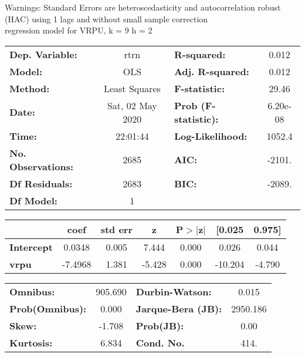 Warnings: \newline
 [1] Standard Errors are heteroscedasticity and autocorrelation robust (HAC) using 1 lags and without small sample correction\\ 

regression model for VRPU, k = 9 h = 2\begin{center}
\begin{tabular}{lclc}
\toprule
\textbf{Dep. Variable:}    &       rtrn       & \textbf{  R-squared:         } &     0.012   \\
\textbf{Model:}            &       OLS        & \textbf{  Adj. R-squared:    } &     0.012   \\
\textbf{Method:}           &  Least Squares   & \textbf{  F-statistic:       } &     29.46   \\
\textbf{Date:}             & Sat, 02 May 2020 & \textbf{  Prob (F-statistic):} &  6.20e-08   \\
\textbf{Time:}             &     22:01:44     & \textbf{  Log-Likelihood:    } &    1052.4   \\
\textbf{No. Observations:} &        2685      & \textbf{  AIC:               } &    -2101.   \\
\textbf{Df Residuals:}     &        2683      & \textbf{  BIC:               } &    -2089.   \\
\textbf{Df Model:}         &           1      & \textbf{                     } &             \\
\bottomrule
\end{tabular}
\begin{tabular}{lcccccc}
                   & \textbf{coef} & \textbf{std err} & \textbf{z} & \textbf{P$> |$z$|$} & \textbf{[0.025} & \textbf{0.975]}  \\
\midrule
\textbf{Intercept} &       0.0348  &        0.005     &     7.444  &         0.000        &        0.026    &        0.044     \\
\textbf{vrpu}      &      -7.4968  &        1.381     &    -5.428  &         0.000        &      -10.204    &       -4.790     \\
\bottomrule
\end{tabular}
\begin{tabular}{lclc}
\textbf{Omnibus:}       & 905.690 & \textbf{  Durbin-Watson:     } &    0.015  \\
\textbf{Prob(Omnibus):} &   0.000 & \textbf{  Jarque-Bera (JB):  } & 2950.186  \\
\textbf{Skew:}          &  -1.708 & \textbf{  Prob(JB):          } &     0.00  \\
\textbf{Kurtosis:}      &   6.834 & \textbf{  Cond. No.          } &     414.  \\
\bottomrule
\end{tabular}
\end{center}

